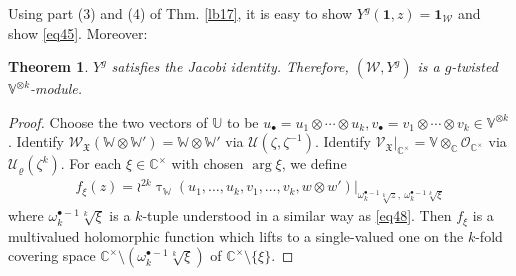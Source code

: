 \documentclass[12pt,a4paper,notitlepage]{article}
\theoremstyle{definition}
\theoremstyle{plain}
\newtheorem{thm}[df]{Theorem}
\newcommand{\fk}{\mathfrak}
\newcommand{\mc}{\mathcal}
\newcommand{\id}{\mathbf{1}}
\newcommand{\scr}{\mathscr}
\newcommand{\blt}{\bullet}
\newcommand{\Vbb}{\mathbb V}
\newcommand{\Ubb}{\mathbb U}
\newcommand{\Wbb}{\mathbb W}
\newcommand{\Cbb}{\mathbb C}
\numberwithin{equation}{section}
\begin{document}
Using part (3) and (4) of Thm. \ref{lb17}, it is easy to show $Y^g(\id,z)=\id_{\mc W}$ and show \eqref{eq45}. Moreover:

\begin{thm}
$Y^g$ satisfies the Jacobi identity. Therefore, $(\mc W,Y^g)$ is a $g$-twisted $\Vbb^{\otimes k}$-module.
\end{thm}


\begin{proof}
Choose the two vectors of $\Ubb$ to be $u_\blt=u_1\otimes\cdots\otimes u_k,v_\blt=v_1\otimes\cdots\otimes v_k\in\Vbb^{\otimes k}$. Identify $\scr W_{\fk X}(\Wbb\otimes\Wbb')=\Wbb\otimes\Wbb'$ via $\mc U(\zeta,\zeta^{-1})$. Identify $\scr V_{\fk X}|_{\Cbb^\times}=\Vbb\otimes_\Cbb\scr O_{\Cbb^\times}$ via $\mc U_\varrho(\zeta^k)$. For each $\xi\in\Cbb^\times$ with chosen $\arg \xi$, we define
\begin{align}
f_\xi(z)=\wr^{2k}\uptau_\Wbb(u_1,\dots,u_k,v_1,\dots,v_k,w\otimes w')\Big|_{\omega_k^{\blt-1}\sqrt[k]{z},~\omega_k^{\blt-1}\sqrt[k]{\xi}}\label{eq47}
\end{align}
where $\omega_k^{\blt-1}\sqrt[k]{\xi}$ is a $k$-tuple understood in a similar way as \eqref{eq48}. Then $f_\xi$ is a multivalued holomorphic function which lifts to a single-valued one on the  $k$-fold covering space  $\Cbb^\times\setminus(\omega_k^{\blt-1}\sqrt[k]{\xi})$ of $\Cbb^\times\setminus\{\xi\}$.


\end{proof}
\end{document}
